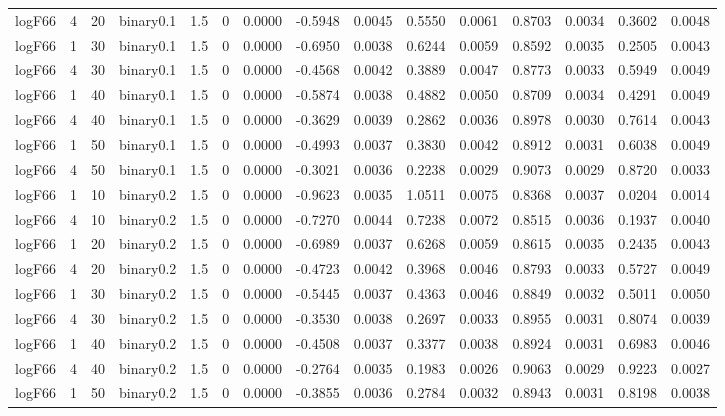 \begin{longtable}{rrrrrrrrrrrrrrr}
  logF66 & 4 & 20 & binary0.1 & 1.5 & 0 & 0.0000 & -0.5948 & 0.0045 & 0.5550 & 0.0061 & 0.8703 & 0.0034 & 0.3602 & 0.0048 \\ 
  logF66 & 1 & 30 & binary0.1 & 1.5 & 0 & 0.0000 & -0.6950 & 0.0038 & 0.6244 & 0.0059 & 0.8592 & 0.0035 & 0.2505 & 0.0043 \\ 
  logF66 & 4 & 30 & binary0.1 & 1.5 & 0 & 0.0000 & -0.4568 & 0.0042 & 0.3889 & 0.0047 & 0.8773 & 0.0033 & 0.5949 & 0.0049 \\ 
  logF66 & 1 & 40 & binary0.1 & 1.5 & 0 & 0.0000 & -0.5874 & 0.0038 & 0.4882 & 0.0050 & 0.8709 & 0.0034 & 0.4291 & 0.0049 \\ 
  logF66 & 4 & 40 & binary0.1 & 1.5 & 0 & 0.0000 & -0.3629 & 0.0039 & 0.2862 & 0.0036 & 0.8978 & 0.0030 & 0.7614 & 0.0043 \\ 
  logF66 & 1 & 50 & binary0.1 & 1.5 & 0 & 0.0000 & -0.4993 & 0.0037 & 0.3830 & 0.0042 & 0.8912 & 0.0031 & 0.6038 & 0.0049 \\ 
  logF66 & 4 & 50 & binary0.1 & 1.5 & 0 & 0.0000 & -0.3021 & 0.0036 & 0.2238 & 0.0029 & 0.9073 & 0.0029 & 0.8720 & 0.0033 \\ 
  logF66 & 1 & 10 & binary0.2 & 1.5 & 0 & 0.0000 & -0.9623 & 0.0035 & 1.0511 & 0.0075 & 0.8368 & 0.0037 & 0.0204 & 0.0014 \\ 
  logF66 & 4 & 10 & binary0.2 & 1.5 & 0 & 0.0000 & -0.7270 & 0.0044 & 0.7238 & 0.0072 & 0.8515 & 0.0036 & 0.1937 & 0.0040 \\ 
  logF66 & 1 & 20 & binary0.2 & 1.5 & 0 & 0.0000 & -0.6989 & 0.0037 & 0.6268 & 0.0059 & 0.8615 & 0.0035 & 0.2435 & 0.0043 \\ 
  logF66 & 4 & 20 & binary0.2 & 1.5 & 0 & 0.0000 & -0.4723 & 0.0042 & 0.3968 & 0.0046 & 0.8793 & 0.0033 & 0.5727 & 0.0049 \\ 
  logF66 & 1 & 30 & binary0.2 & 1.5 & 0 & 0.0000 & -0.5445 & 0.0037 & 0.4363 & 0.0046 & 0.8849 & 0.0032 & 0.5011 & 0.0050 \\ 
  logF66 & 4 & 30 & binary0.2 & 1.5 & 0 & 0.0000 & -0.3530 & 0.0038 & 0.2697 & 0.0033 & 0.8955 & 0.0031 & 0.8074 & 0.0039 \\ 
  logF66 & 1 & 40 & binary0.2 & 1.5 & 0 & 0.0000 & -0.4508 & 0.0037 & 0.3377 & 0.0038 & 0.8924 & 0.0031 & 0.6983 & 0.0046 \\ 
  logF66 & 4 & 40 & binary0.2 & 1.5 & 0 & 0.0000 & -0.2764 & 0.0035 & 0.1983 & 0.0026 & 0.9063 & 0.0029 & 0.9223 & 0.0027 \\ 
  logF66 & 1 & 50 & binary0.2 & 1.5 & 0 & 0.0000 & -0.3855 & 0.0036 & 0.2784 & 0.0032 & 0.8943 & 0.0031 & 0.8198 & 0.0038 \\ 

\end{longtable}
